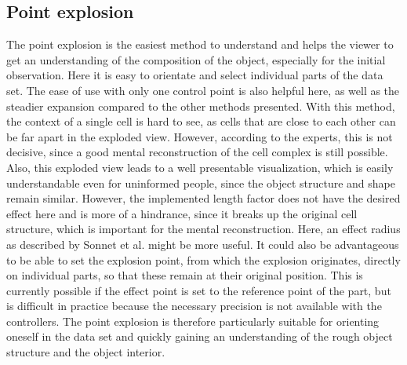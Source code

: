 \subsection{Point explosion}
The point explosion is the easiest method to understand and helps the viewer to get an understanding of the composition of the object, especially for the initial observation.
Here it is easy to orientate and select individual parts of the data set.
The ease of use with only one control point is also helpful here, as well as the steadier expansion compared to the other methods presented.
With this method, the context of a single cell is hard to see, as cells that are close to each other can be far apart in the exploded view. However, according to the experts, this is not decisive, since a good mental reconstruction of the cell complex is still possible. Also, this exploded view leads to a well presentable visualization, which is easily understandable even for uninformed people, since the object structure and shape remain similar.
However, the implemented length factor does not have the desired effect here and is more of a hindrance, since it breaks up the original cell structure, which is important for the mental reconstruction.
Here, an effect radius as described by Sonnet et al. might be more useful.
It could also be advantageous to be able to set the explosion point, from which the explosion originates, directly on individual parts, so that these remain at their original position.
This is currently possible if the effect point is set to the reference point of the part, but is difficult in practice because the necessary precision is not available with the controllers.
The point explosion is therefore particularly suitable for orienting oneself in the data set and quickly gaining an understanding of the rough object structure and the object interior.

